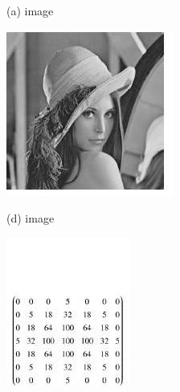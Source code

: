 \documentclass[10pt]{article}
\begin{document}
(a) image

\includegraphics[max width=\textwidth]{2022_01_06_b5ce182ed1bd5f482e5bg-20(1)}

(d) image

\includegraphics[max width=\textwidth]{2022_01_06_b5ce182ed1bd5f482e5bg-20(2)}
\end{document}
